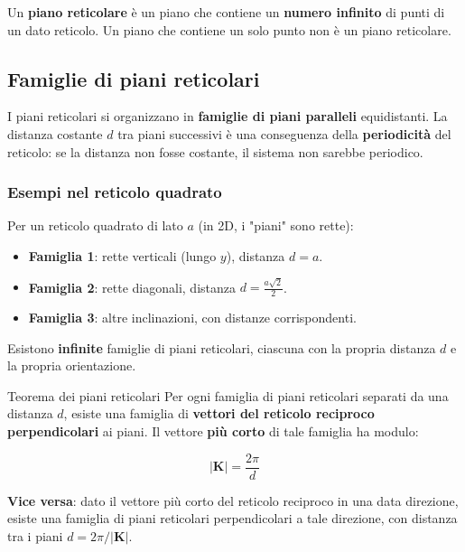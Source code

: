 Un \textbf{piano reticolare} è un piano che contiene un \textbf{numero infinito} di punti di un dato reticolo. Un piano che contiene un solo punto non è un piano reticolare.

\subsection*{Famiglie di piani reticolari}

I piani reticolari si organizzano in \textbf{famiglie di piani paralleli} equidistanti. La distanza costante $d$ tra piani successivi è una conseguenza della \textbf{periodicità} del reticolo: se la distanza non fosse costante, il sistema non sarebbe periodico.

\subsubsection{Esempi nel reticolo quadrato}

Per un reticolo quadrato di lato $a$ (in 2D, i "piani" sono rette):

\begin{itemize}
    \item \textbf{Famiglia 1}: rette verticali (lungo $y$), distanza $d = a$.
    \item \textbf{Famiglia 2}: rette diagonali, distanza $d = \frac{a\sqrt{2}}{2}$.
    \item \textbf{Famiglia 3}: altre inclinazioni, con distanze corrispondenti.
\end{itemize}

Esistono \textbf{infinite} famiglie di piani reticolari, ciascuna con la propria distanza $d$ e la propria orientazione.



\begin{definizione}{Teorema dei piani reticolari}
Per ogni famiglia di piani reticolari separati da una distanza $d$, esiste una famiglia di \textbf{vettori del reticolo reciproco perpendicolari} ai piani. Il vettore \textbf{più corto} di tale famiglia ha modulo:

\begin{equation}
|\mathbf{K}| = \frac{2\pi}{d}
\end{equation}

\textbf{Vice versa}: dato il vettore più corto del reticolo reciproco in una data direzione, esiste una famiglia di piani reticolari perpendicolari a tale direzione, con distanza tra i piani $d = 2\pi/|\mathbf{K}|$.
\end{definizione}

